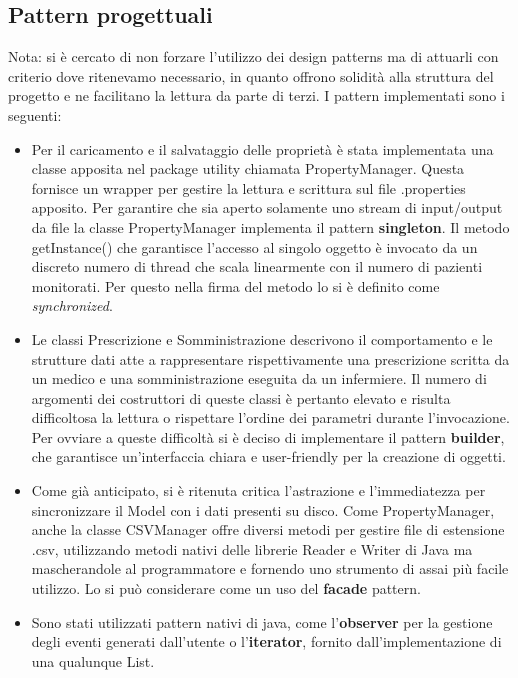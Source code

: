 \documentclass[a4paper]{report}
\begin{document}
        \subsection*{Pattern progettuali}
            Nota: si \`e cercato di non forzare l'utilizzo dei design patterns ma di attuarli con criterio dove ritenevamo necessario, in quanto offrono solidit\`a alla struttura del progetto e ne facilitano la lettura da parte di terzi. I pattern implementati sono i seguenti:
            \begin{itemize}
                \item Per il caricamento e il salvataggio delle propriet\`a \`e stata implementata una classe apposita nel package utility chiamata PropertyManager. Questa fornisce un wrapper per gestire la lettura e scrittura sul file .properties apposito. Per garantire che sia aperto solamente uno stream di input/output da file la classe PropertyManager implementa il pattern \textbf{singleton}. Il metodo getInstance() che garantisce l'accesso al singolo oggetto \`e invocato da un discreto numero di thread che scala linearmente con il numero di pazienti monitorati. Per questo nella firma del metodo lo si \`e definito come \textit{synchronized}.
                \item Le classi Prescrizione e Somministrazione descrivono il comportamento e le strutture dati atte a rappresentare rispettivamente una prescrizione scritta da un medico e una somministrazione eseguita da un infermiere. Il numero di argomenti dei costruttori di queste classi \`e pertanto elevato e risulta difficoltosa la lettura o rispettare l'ordine dei parametri durante l'invocazione. Per ovviare a queste difficolt\`a si \`e deciso di implementare il pattern \textbf{builder}, che garantisce un'interfaccia chiara e user-friendly per la creazione di oggetti.
                \item Come gi\`a anticipato, si \`e ritenuta critica l'astrazione e l'immediatezza per sincronizzare il Model con i dati presenti su disco. Come PropertyManager, anche la classe CSVManager offre diversi metodi per gestire file di estensione .csv, utilizzando metodi nativi delle librerie Reader e Writer di Java ma mascherandole al programmatore e fornendo uno strumento di assai pi\`u facile utilizzo. Lo si pu\`o considerare come un uso del \textbf{facade} pattern.
                \item Sono stati utilizzati pattern nativi di java, come l'\textbf{observer} per la gestione degli eventi generati dall'utente o l'\textbf{iterator}, fornito dall'implementazione di una qualunque List.

\end{itemize}
\end{document}
